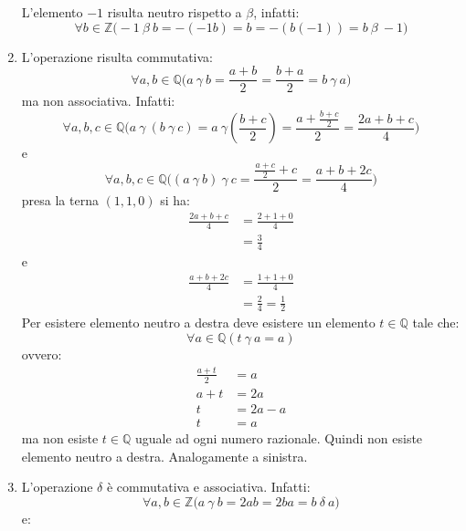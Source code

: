 \begin{enumerate}
\begin{displaymath}
	\end{displaymath}
	L'elemento $-1$ risulta neutro rispetto a $\beta$, infatti:
	\begin{displaymath}
		\forall b \in \mathbb{Z} \bigl(-1 \ \beta \ b = -(-1b)=b = -(b(-1))=b \ \beta \ -1 \bigr)
	\end{displaymath}
	\item L'operazione risulta commutativa:
	\begin{displaymath}
		\forall a,b \in \mathbb{Q} \bigl( a \ \gamma \ b = \frac{a+b}{2} = \frac{b+a}{2} = b \ \gamma \ a \bigr)
	\end{displaymath}
	ma non associativa. Infatti:
	\begin{displaymath}
		\forall a,b,c \in \mathbb{Q} \bigl(a \ \gamma \ (b \ \gamma \ c ) = a \ \gamma (\frac{b+c}{2}) = \frac{a+ \frac{b+c}{2}}{2} = \frac{2a+b+c}{4}  \bigr)
	\end{displaymath}
	e \begin{displaymath}
		\forall a,b,c \in \mathbb{Q} \bigl((a \ \gamma \ b) \ \gamma \ c = \frac{\frac{a+c}{2}+c}{2}= \frac{a+b+2c}{4}\bigr)
	\end{displaymath}
	presa la terna $(1,1,0)$ si ha:
	\begin{align*}
		\frac{2a+b+c}{4}&=\frac{2+1+0}{4}\\
		&=\frac{3}{4}
	\end{align*}
	e
	\begin{align*}
		\frac{a+b+2c}{4}&=\frac{1+1+0}{4}\\
		&=\frac{2}{4}=\frac{1}{2}
	\end{align*}
	Per esistere elemento neutro a destra deve esistere un elemento $t \in \mathbb{Q}$ tale che:
	\begin{displaymath}
		\forall a \in \mathbb{Q} (t \ \gamma \ a = a)
	\end{displaymath}
	ovvero:
	\begin{align*}
		\frac{a+t}{2}&=a \\
		a+t &= 2a \\
		t &= 2a-a \\
		t&=a
	\end{align*}
	ma non esiste $t \in \mathbb{Q}$ uguale ad ogni numero razionale. Quindi non esiste elemento neutro a destra. Analogamente a sinistra.
	\item L'operazione $\delta$ è commutativa e associativa. Infatti:
	$$ \forall a,b \in \mathbb{Z} \bigl( a \ \gamma \ b = 2ab = 2ba = b \ \delta \ a\bigr) $$
	e:
	\begin{displaymath}
		\begin{array}{l}

\end{array}
\end{displaymath}
\end{enumerate}
